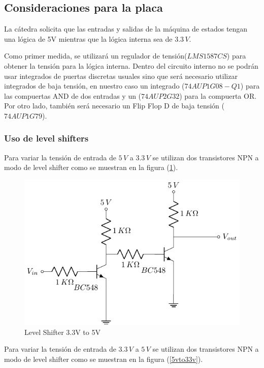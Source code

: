 \subsection{Consideraciones para la placa}
La cátedra solicita que las entradas y salidas de la máquina de estados tengan una lógica de 5V mientras que la lógica interna sea de $3.3\,V$. \par 
Como primer medida, se utilizará un regulador de tensión($LMS1587CS$) para obtener la tensión para la lógica interna.
Dentro del circuito interno no se podrán usar integrados de puertas discretas usuales sino que será necesario utilizar integrados de baja tensión, en nuestro caso un integrado ($74AUP1G08-Q1$) para las compuertas AND de dos entradas y un ($74AUP2G32$) para la compuerta OR. Por otro lado, también será necesario un Flip Flop D de baja tensión ($74AUP1G79$). \par


\subsubsection{Uso de level shifters}
Para variar la tensión de entrada de $5\,V$ a $3.3\,V$ se utilizan dos transistores NPN a modo de level shifter como se muestran en la figura (\ref{33to5v}).

 \begin{figure}[H]
\begin{center}
\includegraphics[scale=0.75]{Ejercicio3/Circuitos/3_3Vto5V}
\caption{Level Shifter 3.3V to 5V}
\end{center}
\label{33to5v}
\end{figure}
Para variar la tensión de entrada de $3.3\,V$ a $5\,V$ se utilizan dos transistores NPN a modo de level shifter como se muestran en la figura (\ref{5vto33v}).

